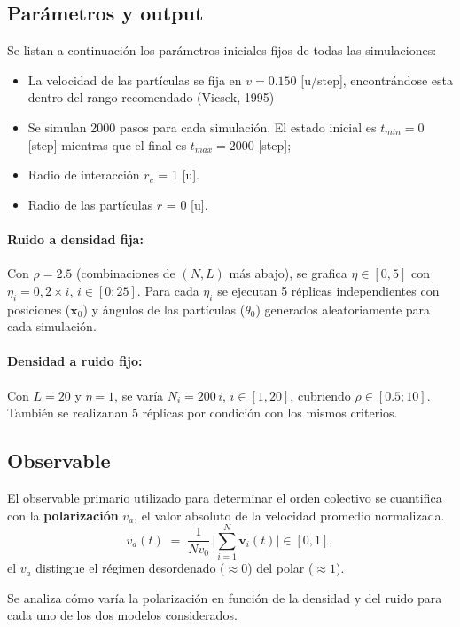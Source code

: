 \documentclass{article}
\begin{document}
\subsection{Parámetros y output}

Se listan a continuación los parámetros iniciales fijos de todas  las simulaciones:

\begin{itemize}
    \item La velocidad de las partículas se fija en \( v = 0.150 \) [u/step], encontrándose esta dentro del rango recomendado (Vicsek, 1995)
    \item Se simulan 2000 pasos para cada simulación. El estado inicial es  \( t_{min} = 0\) [step] mientras que el final es  \(t_{max} = 2000\) [step];
    \item Radio de interacción \(r_c\) = 1 [u]. 
    \item Radio de las partículas \(r\) = 0 [u]. 
\end{itemize}

\paragraph{Ruido a densidad fija:} Con \(\rho=2.5\) (combinaciones de \((N,L)\) más abajo), se grafica \(\eta\in[0,5]\) con \(\eta_i=0,2\times i\), \(i\in[0;25]\). Para cada \(\eta_i\) se ejecutan 5 réplicas independientes con posiciones (\(\mathbf x_0\)) y ángulos de las partículas (\( \theta_0\)) generados aleatoriamente para cada simulación.

\paragraph{Densidad a ruido fijo:} Con \(L=20\) y \(\eta=1\), se varía \(N_i=200\,i\), \(i \in [1,20]\), cubriendo \(\rho\in[0.5;10]\). También se realizanan 5 réplicas por condición con los mismos criterios.


\subsection{Observable}
El observable primario utilizado para determinar el orden colectivo se cuantifica con la \textbf{polarización} \(v_a\), el valor absoluto de la velocidad promedio normalizada.
\[
v_a(t) \;=\; \frac{1}{N v_0}\,\Big|\sum_{i=1}^N \mathbf v_i(t)\Big|\in[0,1],
\]
el \(v_a\) distingue el régimen desordenado (\(\approx 0\)) del polar (\(\approx 1\)). 

Se analiza cómo varía la polarización en función de la densidad y del ruido para cada uno de los dos modelos considerados. 
\end{document}

